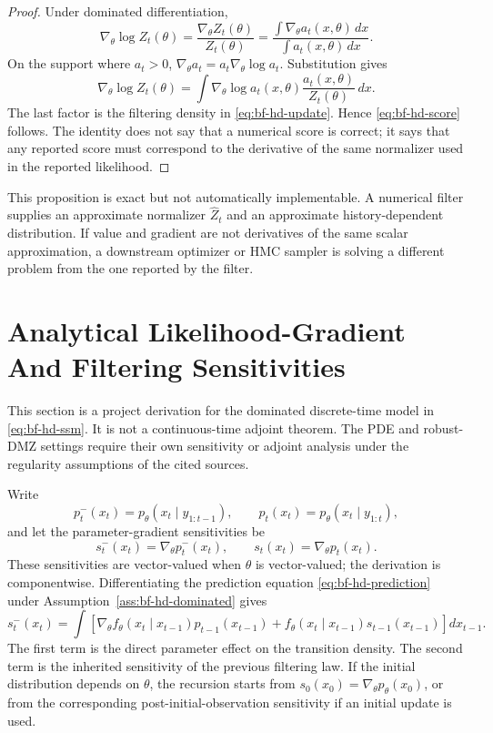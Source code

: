 \begin{proof}
Under dominated differentiation,
\[
  \nabla_\theta\log Z_t(\theta)
  =\frac{\nabla_\theta Z_t(\theta)}{Z_t(\theta)}
  =
  \frac{\int \nabla_\theta a_t(x,\theta)\,dx}
       {\int a_t(x,\theta)\,dx}.
\]
On the support where \(a_t>0\),
\(\nabla_\theta a_t=a_t\nabla_\theta\log a_t\).  Substitution gives
\begin{equation}
  \nabla_\theta\log Z_t(\theta)
  =
  \int \nabla_\theta\log a_t(x,\theta)
       \frac{a_t(x,\theta)}{Z_t(\theta)}\,dx .
\end{equation}
The last factor is the filtering density in
\eqref{eq:bf-hd-update}.  Hence \eqref{eq:bf-hd-score} follows.  The identity
does not say that a numerical score is correct; it says that any reported score
must correspond to the derivative of the same normalizer used in the reported
likelihood.
\end{proof}

This proposition is exact but not automatically implementable.  A numerical
filter supplies an approximate normalizer $\widehat Z_t$ and an approximate
history-dependent distribution.  If value and gradient are not derivatives of
the same scalar approximation, a downstream optimizer or HMC sampler is solving
a different problem from the one reported by the filter.

\section{Analytical Likelihood-Gradient And Filtering Sensitivities}
\label{sec:bf-hd-analytical-likelihood-gradient}

This section is a project derivation for the dominated discrete-time model in
\eqref{eq:bf-hd-ssm}.  It is not a continuous-time adjoint theorem.  The PDE
and robust-DMZ settings require their own sensitivity or adjoint analysis under
the regularity assumptions of the cited sources.

Write
\[
  p_t^-(x_t)=p_\theta(x_t\mid y_{1:t-1}),\qquad
  p_t(x_t)=p_\theta(x_t\mid y_{1:t}),
\]
and let the parameter-gradient sensitivities be
\begin{equation}
  s_t^-(x_t)=\nabla_\theta p_t^-(x_t),\qquad
  s_t(x_t)=\nabla_\theta p_t(x_t).
\end{equation}
These sensitivities are vector-valued when \(\theta\) is vector-valued; the
derivation is componentwise.  Differentiating the prediction equation
\eqref{eq:bf-hd-prediction} under Assumption~\ref{ass:bf-hd-dominated} gives
\begin{equation}
  s^-_t(x_t)
  =
  \int
  \left[
  \nabla_\theta f_\theta(x_t\mid x_{t-1})
  p_{t-1}(x_{t-1})
  +
  f_\theta(x_t\mid x_{t-1})
  s_{t-1}(x_{t-1})
  \right]dx_{t-1}.
  \label{eq:bf-hd-prediction-sensitivity}
\end{equation}
The first term is the direct parameter effect on the transition density.  The
second term is the inherited sensitivity of the previous filtering law.  If
the initial distribution depends on \(\theta\), the recursion starts from
\(s_0(x_0)=\nabla_\theta p_\theta(x_0)\), or from the corresponding
post-initial-observation sensitivity if an initial update is used.

